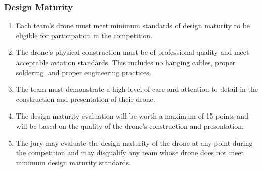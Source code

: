     \subsubsection{Design Maturity}
    \begin{enumerate}
    \item Each team's drone must meet minimum standards of design maturity to be eligible for participation in the competition.
    \item The drone's physical construction must be of professional quality and meet acceptable aviation standards. This includes no hanging cables, proper soldering, and proper engineering practices.
    \item The team must demonstrate a high level of care and attention to detail in the construction and presentation of their drone.
    \item The design maturity evaluation will be worth a maximum of 15 points and will be based on the quality of the drone's construction and presentation.
    \item The jury may evaluate the design maturity of the drone at any point during the competition and may disqualify any team whose drone does not meet minimum design maturity standards.
    \end{enumerate}
    
    
    
    
